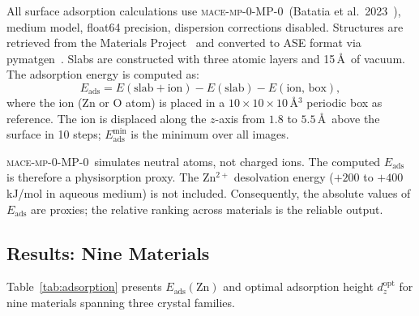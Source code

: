 \documentclass[11pt,a4paper]{article}
\newcommand{\Eads}{E_{\mathrm{ads}}}
\newcommand{\MACE}{\textsc{mace-mp-0}}
\begin{document}
All surface adsorption calculations use \MACE-MP-0\ (Batatia et al.\ 2023~\cite{MACE2023}), medium model, float64 precision, dispersion corrections disabled. Structures are retrieved from the Materials Project~\cite{MP2013} and converted to ASE format via pymatgen~\cite{pymatgen2013}. Slabs are constructed with three atomic layers and 15\,\AA\ of vacuum. The adsorption energy is computed as:
\begin{equation}
\Eads = E(\text{slab} + \text{ion}) - E(\text{slab}) - E(\text{ion, box}),
\end{equation}
where the ion (Zn or O atom) is placed in a $10 \times 10 \times 10$\,\AA$^3$ periodic box as reference. The ion is displaced along the $z$-axis from $1.8$ to $5.5$\,\AA\ above the surface in 10 steps; $\Eads^{\min}$ is the minimum over all images.

\begin{remark}
\MACE-MP-0\ simulates neutral atoms, not charged ions. The computed $\Eads$ is therefore a physisorption proxy. The Zn$^{2+}$ desolvation energy ($+200$ to $+400$\,kJ/mol in aqueous medium) is not included. Consequently, the absolute values of $\Eads$ are proxies; the relative ranking across materials is the reliable output.
\end{remark}

\subsection{Results: Nine Materials}

Table~\ref{tab:adsorption} presents $\Eads(\mathrm{Zn})$ and optimal adsorption height $d_z^{\mathrm{opt}}$ for nine materials spanning three crystal families.
\end{document}
